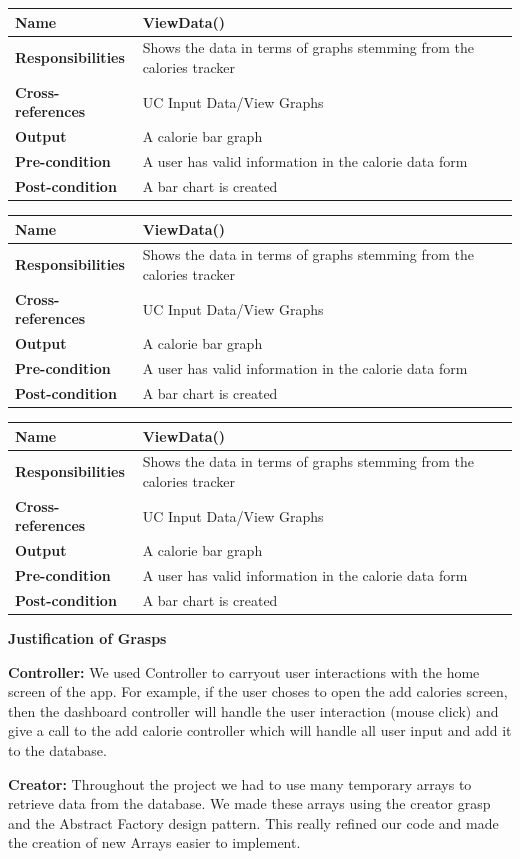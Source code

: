 \documentclass[10pt]{article}
\begin{document}
\begin{longtable}[]{@{}ll@{}}
\toprule
\textbf{Name} & \textbf{ViewData()}\tabularnewline
\midrule
\endhead
\textbf{Responsibilities} & Shows the data in terms of graphs stemming
from the calories tracker\tabularnewline
\textbf{Cross-references} & UC Input Data/View Graphs\tabularnewline
\textbf{Output} & A calorie bar graph\tabularnewline
\textbf{Pre-condition} & A user has valid information in the calorie
data form\tabularnewline
\textbf{Post-condition} & A bar chart is created\tabularnewline
\bottomrule
\end{longtable}
\begin{longtable}[]{@{}ll@{}}
\toprule
\textbf{Name} & \textbf{ViewData()}\tabularnewline
\midrule
\endhead
\textbf{Responsibilities} & Shows the data in terms of graphs stemming
from the calories tracker\tabularnewline
\textbf{Cross-references} & UC Input Data/View Graphs\tabularnewline
\textbf{Output} & A calorie bar graph\tabularnewline
\textbf{Pre-condition} & A user has valid information in the calorie
data form\tabularnewline
\textbf{Post-condition} & A bar chart is created\tabularnewline
\bottomrule
\end{longtable}
\begin{longtable}[]{@{}ll@{}}
\toprule
\textbf{Name} & \textbf{ViewData()}\tabularnewline
\midrule
\endhead
\textbf{Responsibilities} & Shows the data in terms of graphs stemming
from the calories tracker\tabularnewline
\textbf{Cross-references} & UC Input Data/View Graphs\tabularnewline
\textbf{Output} & A calorie bar graph\tabularnewline
\textbf{Pre-condition} & A user has valid information in the calorie
data form\tabularnewline
\textbf{Post-condition} & A bar chart is created\tabularnewline
\bottomrule
\end{longtable}


\textbf{Justification of Grasps}

\textbf{Controller:} We used Controller to carryout user interactions
with the home screen of the app. For example, if the user choses to open
the add calories screen, then the dashboard controller will handle the
user interaction (mouse click) and give a call to the add calorie
controller which will handle all user input and add it to the database.

\textbf{Creator:} Throughout the project we had to use many temporary
arrays to retrieve data from the database. We made these arrays using
the creator grasp and the Abstract Factory design pattern. This really
refined our code and made the creation of new Arrays easier to
implement.
\end{document}
